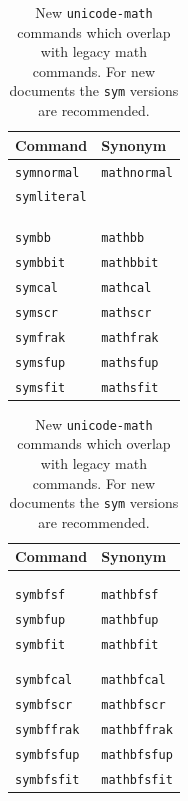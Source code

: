 \documentclass[11pt]{article}
\begin{document}
\begin{table}[H]
    \caption{New \texttt{unicode-math} commands which overlap with legacy
        math commands. For new documents the \texttt{sym} versions are recommended.}
    \centering
    \begin{tabular}[t]{ll}
        \toprule
        Command & Synonym \\
        \midrule
        \texttt{symnormal}  & \texttt{mathnormal} \\
        \texttt{symliteral} &                 \\
        &  \\
        &  \\
        &  \\
        \texttt{symbb}      & \texttt{mathbb}     \\
        \texttt{symbbit}    & \texttt{mathbbit}   \\
        \texttt{symcal}     & \texttt{mathcal}    \\
        \texttt{symscr}     & \texttt{mathscr}    \\
        \texttt{symfrak}    & \texttt{mathfrak}   \\
        \texttt{symsfup}    & \texttt{mathsfup}   \\
        \texttt{symsfit}    & \texttt{mathsfit}   \\
        \bottomrule
    \end{tabular}\qquad
    \begin{tabular}[t]{ll}
        \toprule
        Command & Synonym \\
        \midrule
        &  \\
        &  \\
        \texttt{symbfsf}    & \texttt{mathbfsf}   \\
        \texttt{symbfup}    & \texttt{mathbfup}   \\
        \texttt{symbfit}    & \texttt{mathbfit}   \\
        &  \\
        &  \\
        \texttt{symbfcal}   & \texttt{mathbfcal}  \\
        \texttt{symbfscr}   & \texttt{mathbfscr}  \\
        \texttt{symbffrak}  & \texttt{mathbffrak} \\
        \texttt{symbfsfup}  & \texttt{mathbfsfup} \\
        \texttt{symbfsfit}  & \texttt{mathbfsfit} \\
        \bottomrule
    \end{tabular}
\end{table}
\end{document}
